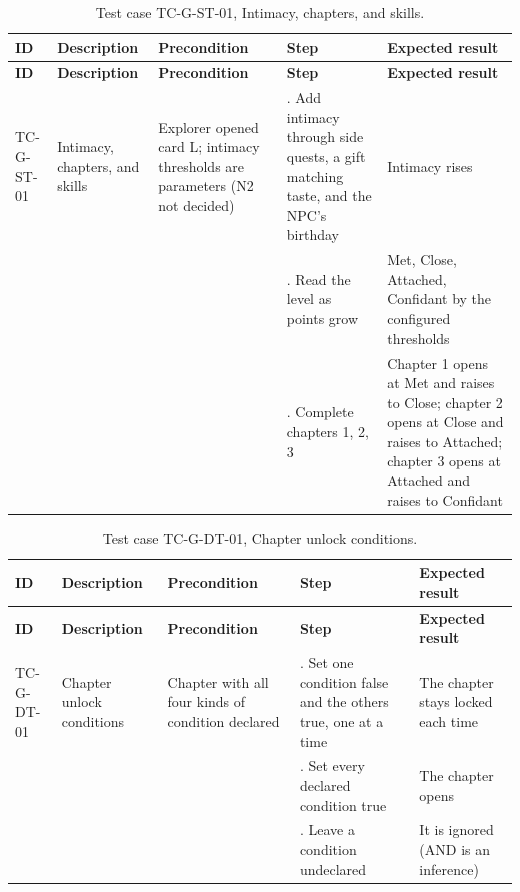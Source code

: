 {\small
\begin{longtable}{|>{\raggedright\arraybackslash}p{}|>{\raggedright\arraybackslash}p{}|>{\raggedright\arraybackslash}p{}|>{\raggedright\arraybackslash}p{}|>{\raggedright\arraybackslash}p{}|}
\caption{Test case TC-G-ST-01, Intimacy, chapters, and skills.} \\
\hline
\textbf{ID} & \textbf{Description} & \textbf{Precondition} & \textbf{Step} & \textbf{Expected result} \\ \hline
\endfirsthead
\hline
\textbf{ID} & \textbf{Description} & \textbf{Precondition} & \textbf{Step} & \textbf{Expected result} \\ \hline
\endhead
TC-G-ST-01 & Intimacy, chapters, and skills & Explorer opened card L; intimacy thresholds are parameters (N2 not decided) & 1. Add intimacy through side quests, a gift matching taste, and the NPC's birthday & Intimacy rises \\ \hline
 &  &  & 2. Read the level as points grow & Met, Close, Attached, Confidant by the configured thresholds \\ \hline
 &  &  & 3. Complete chapters 1, 2, 3 & Chapter 1 opens at Met and raises to Close; chapter 2 opens at Close and raises to Attached; chapter 3 opens at Attached and raises to Confidant \\ \hline
\end{longtable}
}

{\small
\begin{longtable}{|>{\raggedright\arraybackslash}p{}|>{\raggedright\arraybackslash}p{}|>{\raggedright\arraybackslash}p{}|>{\raggedright\arraybackslash}p{}|>{\raggedright\arraybackslash}p{}|}
\caption{Test case TC-G-DT-01, Chapter unlock conditions.} \\
\hline
\textbf{ID} & \textbf{Description} & \textbf{Precondition} & \textbf{Step} & \textbf{Expected result} \\ \hline
\endfirsthead
\hline
\textbf{ID} & \textbf{Description} & \textbf{Precondition} & \textbf{Step} & \textbf{Expected result} \\ \hline
\endhead
TC-G-DT-01 & Chapter unlock conditions & Chapter with all four kinds of condition declared & 1. Set one condition false and the others true, one at a time & The chapter stays locked each time \\ \hline
 &  &  & 2. Set every declared condition true & The chapter opens \\ \hline
 &  &  & 3. Leave a condition undeclared & It is ignored (AND is an inference) \\ \hline
\end{longtable}
}

